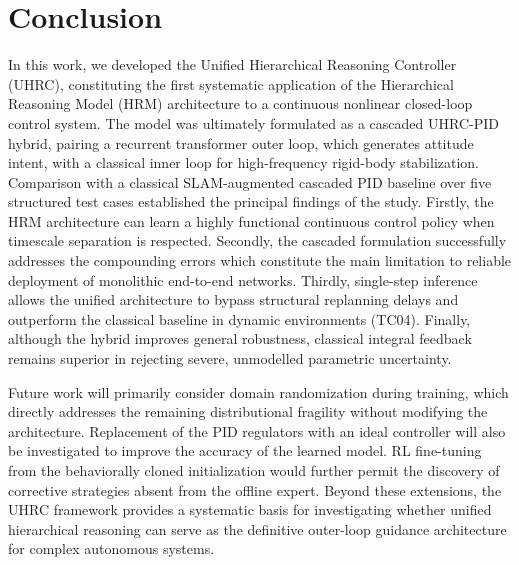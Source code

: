\documentclass[12pt, a4paper]{article}
\begin{document}
\section{Conclusion}
\label{sec:conclusion}

In this work, we developed the Unified Hierarchical Reasoning Controller (UHRC), constituting the first systematic application of the Hierarchical Reasoning Model (HRM) architecture to a continuous nonlinear closed-loop control system.
The model was ultimately formulated as a cascaded UHRC-PID hybrid, pairing a recurrent transformer outer loop, which generates attitude intent, with a classical inner loop for high-frequency rigid-body stabilization.
Comparison with a classical SLAM-augmented cascaded PID baseline over five structured test cases established the principal findings of the study.
Firstly, the HRM architecture can learn a highly functional continuous control policy when timescale separation is respected.
Secondly, the cascaded formulation successfully addresses the compounding errors which constitute the main limitation to reliable deployment of monolithic end-to-end networks.
Thirdly, single-step inference allows the unified architecture to bypass structural replanning delays and outperform the classical baseline in dynamic environments (TC04).
Finally, although the hybrid improves general robustness, classical integral feedback remains superior in rejecting severe, unmodelled parametric uncertainty.

Future work will primarily consider domain randomization during training, which directly addresses the remaining distributional fragility without modifying the architecture.
Replacement of the PID regulators with an ideal controller will also be investigated to improve the accuracy of the learned model.
RL fine-tuning from the behaviorally cloned initialization would further permit the discovery of corrective strategies absent from the offline expert.
Beyond these extensions, the UHRC framework provides a systematic basis for investigating whether unified hierarchical reasoning can serve as the definitive outer-loop guidance architecture for complex autonomous systems.
\printbibliography
\end{document}
